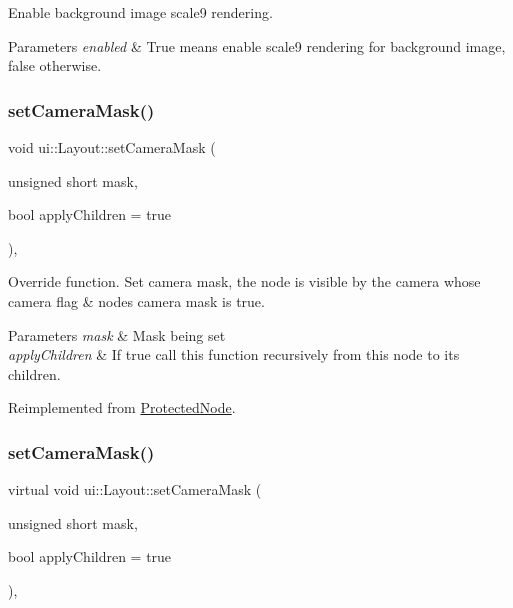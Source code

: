 Enable background image scale9 rendering.


\begin{DoxyParams}{Parameters}
{\em enabled} & True means enable scale9 rendering for background image, false otherwise. \\
\hline
\end{DoxyParams}
\mbox{\label{classui_1_1Layout_a38e44717b8af16b5b5c1f299081ae854}} 
\subsubsection{\texorpdfstring{set\+Camera\+Mask()}{setCameraMask()}\hspace{0.1cm}{\footnotesize\ttfamily [1/2]}}
{\footnotesize\ttfamily void ui\+::\+Layout\+::set\+Camera\+Mask (\begin{DoxyParamCaption}\item[{unsigned short}]{mask,  }\item[{bool}]{apply\+Children = {\ttfamily true} }\end{DoxyParamCaption})\hspace{0.3cm}{\ttfamily [override]}, {\ttfamily [virtual]}}

Override function. Set camera mask, the node is visible by the camera whose camera flag \& node\textquotesingle{}s camera mask is true. 
\begin{DoxyParams}{Parameters}
{\em mask} & Mask being set \\
\hline
{\em apply\+Children} & If true call this function recursively from this node to its children. \\
\hline
\end{DoxyParams}


Reimplemented from \hyperlink{classProtectedNode_a45ddaa88c746ea6707b8a09bb50b457d}{Protected\+Node}.

\mbox{\label{classui_1_1Layout_a7468a69a70aa481c7a429db365f0362c}} 
\subsubsection{\texorpdfstring{set\+Camera\+Mask()}{setCameraMask()}\hspace{0.1cm}{\footnotesize\ttfamily [2/2]}}
{\footnotesize\ttfamily virtual void ui\+::\+Layout\+::set\+Camera\+Mask (\begin{DoxyParamCaption}\item[{unsigned short}]{mask,  }\item[{bool}]{apply\+Children = {\ttfamily true} }\end{DoxyParamCaption})\hspace{0.3cm}{\ttfamily [override]}, {\ttfamily [virtual]}}

